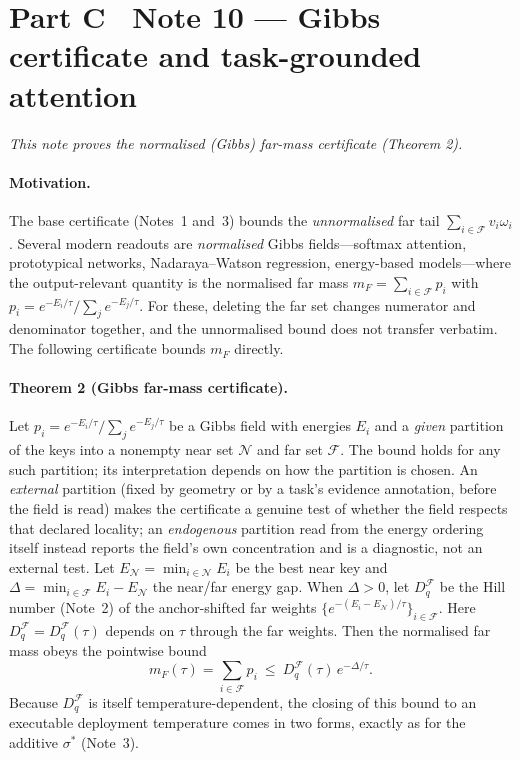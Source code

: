 \documentclass[10pt,twocolumn]{article}
\newcommand{\sstar}{\sigma^{*}}
\begin{document}
\section*{Part C \textperiodcentered\ Note 10 --- Gibbs certificate and task-grounded attention}
\label{si:gibbs}
\emph{This note proves the normalised (Gibbs) far-mass certificate (Theorem 2).}
\paragraph{Motivation.} The base certificate (Notes~1 and~3) bounds the \emph{unnormalised} far tail $\sum_{i\in\mathcal{F}}v_i\omega_i$. Several modern readouts are \emph{normalised} Gibbs fields---softmax attention, prototypical networks, Nadaraya--Watson regression, energy-based models---where the output-relevant quantity is the normalised far mass $m_F=\sum_{i\in\mathcal{F}}p_i$ with $p_i=e^{-E_i/\tau}/\sum_j e^{-E_j/\tau}$. For these, deleting the far set changes numerator and denominator together, and the unnormalised bound does not transfer verbatim. The following certificate bounds $m_F$ directly.
\paragraph{Theorem 2 (Gibbs far-mass certificate).} Let $p_i=e^{-E_i/\tau}/\sum_j e^{-E_j/\tau}$ be a Gibbs field with energies $E_i$ and a \emph{given} partition of the keys into a nonempty near set $\mathcal{N}$ and far set $\mathcal{F}$. The bound holds for any such partition; its interpretation depends on how the partition is chosen. An \emph{external} partition (fixed by geometry or by a task's evidence annotation, before the field is read) makes the certificate a genuine test of whether the field respects that declared locality; an \emph{endogenous} partition read from the energy ordering itself instead reports the field's own concentration and is a diagnostic, not an external test. Let $E_{\mathcal N}=\min_{i\in\mathcal N}E_i$ be the best near key and $\Delta=\min_{i\in\mathcal{F}}E_i-E_{\mathcal N}$ the near/far energy gap. When $\Delta>0$, let $D_q^{\mathcal{F}}$ be the Hill number (Note~2) of the anchor-shifted far weights $\{e^{-(E_i-E_{\mathcal N})/\tau}\}_{i\in\mathcal{F}}$. Here $D_q^{\mathcal{F}}=D_q^{\mathcal{F}}(\tau)$ depends on $\tau$ through the far weights. Then the normalised far mass obeys the pointwise bound
\begin{equation}
m_F(\tau)=\sum_{i\in\mathcal{F}}p_i\ \le\ D_q^{\mathcal{F}}(\tau)\,e^{-\Delta/\tau}.
\end{equation}
Because $D_q^{\mathcal{F}}$ is itself temperature-dependent, the closing of this bound to an executable deployment temperature comes in two forms, exactly as for the additive $\sstar$ (Note~3).
\end{document}
